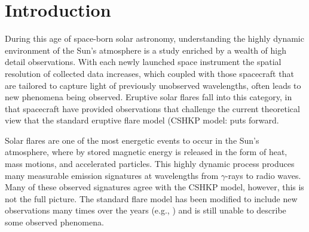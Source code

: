 

\section{Introduction}
During this age of space-born solar astronomy, understanding the highly dynamic environment of the Sun's atmosphere is a study enriched by a wealth of high detail observations. With each newly launched space instrument the spatial resolution of collected data increases, which coupled with those spacecraft that are tailored to capture light of previously unobserved wavelengths, often leads to new phenomena being observed. Eruptive solar flares fall into this category, in that spacecraft have provided observations that challenge the current theoretical view that the standard eruptive flare model (CSHKP model: \citep{1964NASSP..50..451C, 1966Natur.211..695S, 1974SoPh...34..323H, 1976SoPh...50...85K} puts forward.

Solar flares are one of the most energetic events to occur in the Sun's atmosphere, where by stored magnetic energy is released in the form of heat, mass motions, and accelerated particles. This highly dynamic process produces many measurable emission signatures at wavelengths from $\gamma$-rays to radio waves. Many of these observed signatures agree with the CSHKP model, however, this is not the full picture. The standard flare model has been modified to include new observations many times over the years (e.g., \cite{2011LRSP....8....6S}) and is still unable to describe some observed phenomena. 


